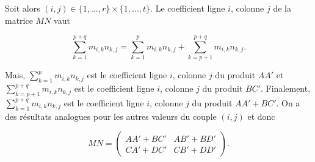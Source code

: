 {\begin{enumerate}
{Soit alors $(i,j)\in\{1,...,r\}\times\{1,...,t\}$. Le coefficient ligne $i$, colonne $j$ de la matrice $MN$ vaut 

$$\sum_{k=1}^{p+q}m_{i,k}n_{k,j}=\sum_{k=1}^{p}m_{i,k}n_{k,j}+\sum_{k=p+1}^{p+q}m_{i,k}n_{k,j}.$$

Mais, $\sum_{k=1}^{p}m_{i,k}n_{k,j}$ est le coefficient ligne $i$, colonne $j$ du produit $AA'$ et $\sum_{k=p+1}^{p+q}m_{i,k}n_{k,j}$ est le coefficient ligne $i$, colonne $j$ du produit $BC'$. Finalement, $\sum_{k=1}^{p+q}m_{i,k}n_{k,j}$ est le coefficient ligne $i$, colonne $j$ du produit $AA'+BC'$. On a des résultats analogues pour les autres valeurs du couple $(i,j)$ et donc

$$MN=\left(
\begin{array}{cc}
AA'+BC'&AB'+BD'\\
CA'+DC'&CB'+DD'
\end{array}
\right).$$}
\end{enumerate}
}